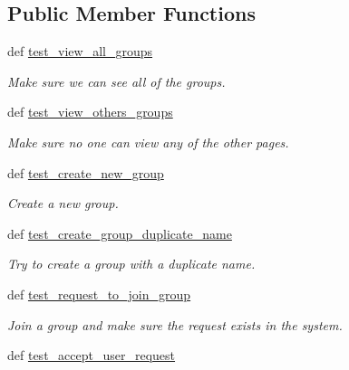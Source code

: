 \subsection*{Public Member Functions}
\begin{DoxyCompactItemize}
\item 
def \hyperlink{classconcertapp_1_1tests_1_1_group_test_a89926cb7c80fa8127cc2079173386071}{test\_\-view\_\-all\_\-groups}
\begin{DoxyCompactList}\small\item\em Make sure we can see all of the groups. \item\end{DoxyCompactList}\item 
def \hyperlink{classconcertapp_1_1tests_1_1_group_test_a3cb702bd11293c50d6eac8d0c895268d}{test\_\-view\_\-others\_\-groups}
\begin{DoxyCompactList}\small\item\em Make sure no one can view any of the other pages. \item\end{DoxyCompactList}\item 
def \hyperlink{classconcertapp_1_1tests_1_1_group_test_ac6ffe13facf3a69bc103ef2c5750a031}{test\_\-create\_\-new\_\-group}
\begin{DoxyCompactList}\small\item\em Create a new group. \item\end{DoxyCompactList}\item 
def \hyperlink{classconcertapp_1_1tests_1_1_group_test_ae88a42347ea932d24b43f3ca70b6169b}{test\_\-create\_\-group\_\-duplicate\_\-name}
\begin{DoxyCompactList}\small\item\em Try to create a group with a duplicate name. \item\end{DoxyCompactList}\item 
def \hyperlink{classconcertapp_1_1tests_1_1_group_test_a8469d3df61597d1ef16a097cf3f89fea}{test\_\-request\_\-to\_\-join\_\-group}
\begin{DoxyCompactList}\small\item\em Join a group and make sure the request exists in the system. \item\end{DoxyCompactList}\item 
def \hyperlink{classconcertapp_1_1tests_1_1_group_test_adbb4d7116ce7e9220e67e1b85068e049}{test\_\-accept\_\-user\_\-request}

\end{DoxyCompactItemize}
